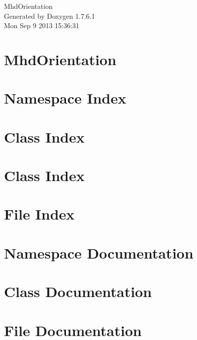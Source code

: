 \documentclass[a4paper]{book}
\begin{document}
\hypersetup{pageanchor=false,citecolor=blue}
\begin{titlepage}
\vspace*{7cm}
\begin{center}
{\Large \-Mhd\-Orientation }\\
\vspace*{1cm}
{\large \-Generated by Doxygen 1.7.6.1}\\
\vspace*{0.5cm}
{\small Mon Sep 9 2013 15:36:31}\\
\end{center}
\end{titlepage}
\clearemptydoublepage
{}
\tableofcontents
\clearemptydoublepage
{}
\hypersetup{pageanchor=true,citecolor=blue}
\chapter{\-Mhd\-Orientation}
\label{index}\hypertarget{index}{}
\chapter{\-Namespace \-Index}

\chapter{\-Class \-Index}

\chapter{\-Class \-Index}

\chapter{\-File \-Index}

\chapter{\-Namespace \-Documentation}


\chapter{\-Class \-Documentation}









\chapter{\-File \-Documentation}














\printindex
\end{document}

